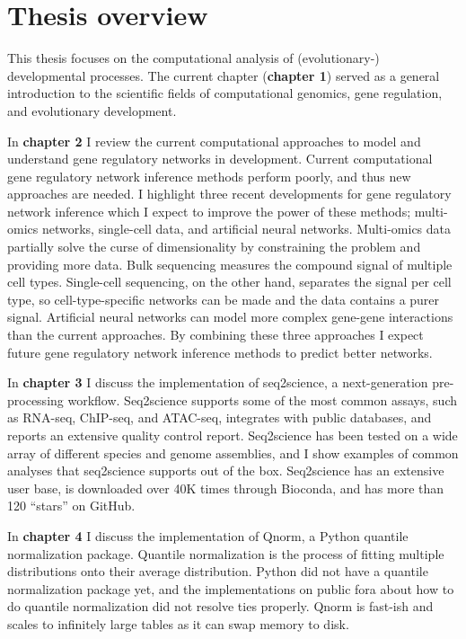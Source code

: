 \section{Thesis overview}

This thesis focuses on the computational analysis of (evolutionary-) developmental processes. The current chapter (\textbf{chapter 1}) served as a general introduction to the scientific fields of computational genomics, gene regulation, and evolutionary development.  

In \textbf{chapter 2} I review the current computational approaches to model and understand gene regulatory networks in development. Current computational gene regulatory network inference methods perform poorly, and thus new approaches are needed. I highlight three recent developments for gene regulatory network inference which I expect to improve the power of these methods; multi-omics networks, single-cell data, and artificial neural networks. Multi-omics data partially solve the curse of dimensionality by constraining the problem and providing more data. Bulk sequencing measures the compound signal of multiple cell types. Single-cell sequencing, on the other hand, separates the signal per cell type, so cell-type-specific networks can be made and the data contains a purer signal. Artificial neural networks can model more complex gene-gene interactions than the current approaches. By combining these three approaches I expect future gene regulatory network inference methods to predict better networks.

In \textbf{chapter 3} I discuss the implementation of seq2science, a next-generation pre-processing workflow. Seq2science supports some of the most common assays, such as RNA-seq, ChIP-seq, and ATAC-seq, integrates with public databases, and reports an extensive quality control report. Seq2science has been tested on a wide array of different species and genome assemblies, and I show examples of common analyses that seq2science supports out of the box. Seq2science has an extensive user base\cite{Bright_2021,Xu_2020,Wester2021,SantosBarriopedro2021,Heuts2023,Tholen2023,Harlaar2022,LunaVelez2023,Neikes2023,Vierboom2021,Smits2020,Smits2022,Heuts2022,Rother2023}, is downloaded over 40K times through Bioconda, and has more than 120 ``stars'' on GitHub.

In \textbf{chapter 4} I discuss the implementation of Qnorm, a Python quantile normalization package. Quantile normalization is the process of fitting multiple distributions onto their average distribution. Python did not have a quantile normalization package yet, and the implementations on public fora about how to do quantile normalization did not resolve ties properly. Qnorm is fast-ish and scales to infinitely large tables as it can swap memory to disk.

